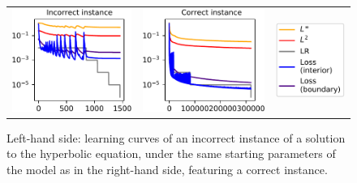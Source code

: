 \documentclass[12pt]{report} %
\begin{document}
\begin{figure}
  \begin{tabular}{ccc}
    \includegraphics{imagenes/experiments/2d/hyperbolic_1d/bad_900_60_2_model_curves.pdf} &
    \includegraphics{imagenes/experiments/2d/hyperbolic_1d/good_900_60_6_model_curves.pdf} &
    \includegraphics{imagenes/experiments/2d/hyperbolic_1d/model_curves_legend.pdf}
  \end{tabular}
  \caption{Left-hand side: learning curves of an incorrect instance of a solution to the hyperbolic equation, under the same starting parameters of the model as in the right-hand side, featuring a correct instance.}
  \label{fig:example-of-model-curves-for-1d-wave-equation}
\end{figure}
\end{document}
